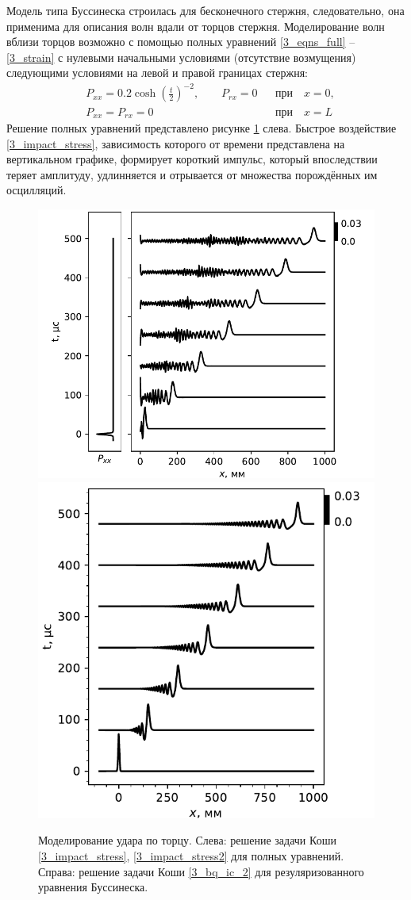 \documentclass[12pt, a4paper]{report}
\newcommand{\lb}{\left (}
\newcommand{\rb}{\right )}
\begin{document}
Модель типа Буссинеска строилась для бесконечного стержня, следовательно, она применима для описания волн вдали от торцов стержня. Моделирование волн вблизи торцов возможно с помощью полных уравнений \eqref{3_eqns_full} -- \eqref{3_strain} с нулевыми начальными условиями (отсутствие возмущения) следующими условиями на левой и правой границах стержня:
\begin{align}
\label{3_impact_stress}
&P_{xx} = 0.2 \cosh\lb\frac t 2\rb^{-2}, \qquad P_{rx} = 0&  &\mbox{при}\quad x = 0,\\
\label{3_impact_stress2}
&P_{xx} = P_{rx} = 0&  &\mbox{при}\quad x = L
\end{align}
Решение полных уравнений представлено рисунке \ref{fig:impact} слева. Быстрое воздействие \eqref{3_impact_stress}, зависимость которого от времени представлена на вертикальном графике, формирует короткий импульс, который впоследствии теряет амплитуду, удлинняется и отрывается от множества порождённых им осцилляций.
\begin{figure}[h]
	\centering
	\includegraphics[width=0.545\linewidth]{figures/Impact}
	\includegraphics[width=0.445\linewidth]{figures/ImpactBq}
	\caption{Моделирование удара по торцу. Слева: решение задачи Коши \eqref{3_impact_stress}, \eqref{3_impact_stress2} для полных уравнений. Справа: решение задачи Коши \eqref{3_bq_ic_2} для резуляризованного уравнения Буссинеска.}
	\label{fig:impact}
\end{figure}
\end{document}
